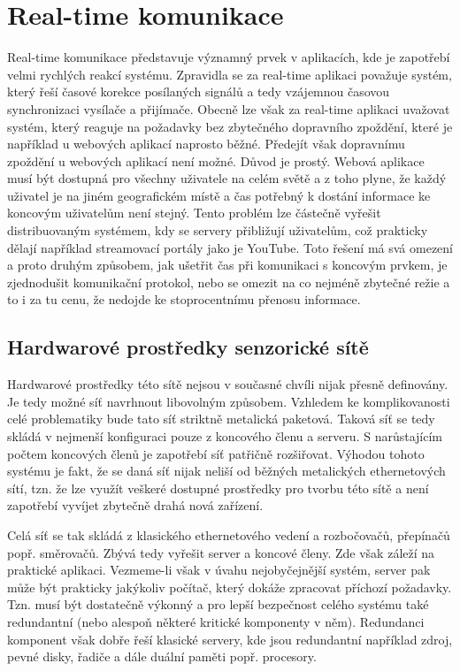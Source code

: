 \chapter{Real-time komunikace}
Real-time komunikace představuje významný prvek v aplikacích, kde je zapotřebí velmi rychlých reakcí systému. Zpravidla se za real-time aplikaci považuje systém, který řeší časové korekce posílaných signálů a tedy vzájemnou časovou synchronizaci vysílače a přijímače. Obecně lze však za real-time aplikaci uvažovat systém, který reaguje na požadavky bez zbytečného dopravního zpoždění, které je například u webových aplikací naprosto běžné. Předejít však dopravnímu zpoždění u webových aplikací není možné. Důvod je prostý. Webová aplikace musí být dostupná pro všechny uživatele na celém světě a z toho plyne, že každý uživatel je na jiném geografickém místě a čas potřebný k dostání informace ke koncovým uživatelům není stejný. Tento problém lze částečně vyřešit distribuovaným systémem, kdy se servery přibližují uživatelům, což prakticky dělají například streamovací portály jako je YouTube. Toto řešení má svá omezení a proto druhým způsobem, jak ušetřit čas při komunikaci s koncovým prvkem, je zjednodušit komunikační protokol, nebo se omezit na co nejméně zbytečné režie a to i za tu cenu, že nedojde ke stoprocentnímu přenosu informace.

\section{Hardwarové prostředky senzorické sítě}
Hardwarové prostředky této sítě nejsou v současné chvíli nijak přesně definovány. Je tedy možné síť navrhnout libovolným způsobem. Vzhledem ke komplikovanosti celé problematiky bude tato síť striktně metalická paketová. Taková síť se tedy skládá v nejmenší konfiguraci pouze z koncového členu a serveru. S narůstajícím počtem koncových členů je zapotřebí síť patřičně rozšiřovat. Výhodou tohoto systému je fakt, že se daná síť nijak neliší od běžných metalických ethernetových sítí, tzn. že lze využít veškeré dostupné prostředky pro tvorbu této sítě a není zapotřebí vyvíjet zbytečně drahá nová zařízení.

Celá síť se tak skládá z klasického ethernetového vedení a rozbočovačů, přepínačů popř. směrovačů. Zbývá tedy vyřešit server a koncové členy. Zde však záleží na praktické aplikaci. Vezmeme-li však v úvahu nejobyčejnější systém, server pak může být prakticky jakýkoliv počítač, který dokáže zpracovat příchozí požadavky. Tzn. musí být dostatečně výkonný a pro lepší bezpečnost celého systému také redundantní (nebo alespoň některé kritické komponenty v něm). Redundanci komponent však dobře řeší klasické servery, kde jsou redundantní například zdroj, pevné disky, řadiče a dále duální paměti popř. procesory.

